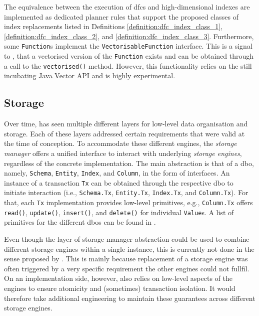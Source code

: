 The equivalence between the execution of \acrshort{dfc}s and high-dimensional indexes are implemented as dedicated planner rules that support the proposed classes of index replacements listed in Definitions \ref{definition:dfc_index_class_1}, \ref{definition:dfc_index_class_2}, and \ref{definition:dfc_index_class_3}. Furthermore, some \texttt{Function}s implement the \texttt{VectorisableFunction} interface. This is a signal to \cottontail{}, that a vectorised version of the \texttt{Function} exists and can be obtained through a call to the \texttt{vectorised()} method. However, this functionality relies on the still incubating Java Vector API and is highly experimental.

\subsection{Storage}
\label{section:cottontail_storage}
Over time, \cottontail{} has seen multiple different layers for low-level data organisation and storage. Each of these layers addressed certain requirements that were valid at the time of conception. To accommodate these different engines, the \emph{storage manager} offers a unified interface to interact with underlying \emph{storage engines}, regardless of the concrete implementation. The main abstraction is that of a \acrfull{dbo}, namely, \texttt{Schema}, \texttt{Entity}, \texttt{Index}, and \texttt{Column}, in the form of interfaces. An instance of a transaction \texttt{Tx} can be obtained through the respective \acrshort{dbo} to initiate interaction (i.e., \texttt{Schema.Tx}, \texttt{Entity.Tx}, \texttt{Index.Tx}, and \texttt{Column.Tx}). For that, each \texttt{Tx} implementation provides low-level primitives, e.g., \texttt{Column.Tx} offers \texttt{read()}, \texttt{update()}, \texttt{insert()}, and \texttt{delete()} for individual \texttt{Value}s. A list of primitives for the different \acrshort{dbo}s can be found in .

Even though the layer of storage manager abstraction could be used to combine different storage engines within a single instance, this is currently not done in the sense proposed by \cite{Giangreco:2018Database}. This is mainly because replacement of a storage engine was often triggered by a very specific requirement the other engines could not fullfil. On an implementation side, however, \cottontail{} also relies on low-level aspects of the engines to ensure atomicity and (sometimes) transaction isolation. It would therefore take additional engineering to maintain these guarantees across different storage engines.

